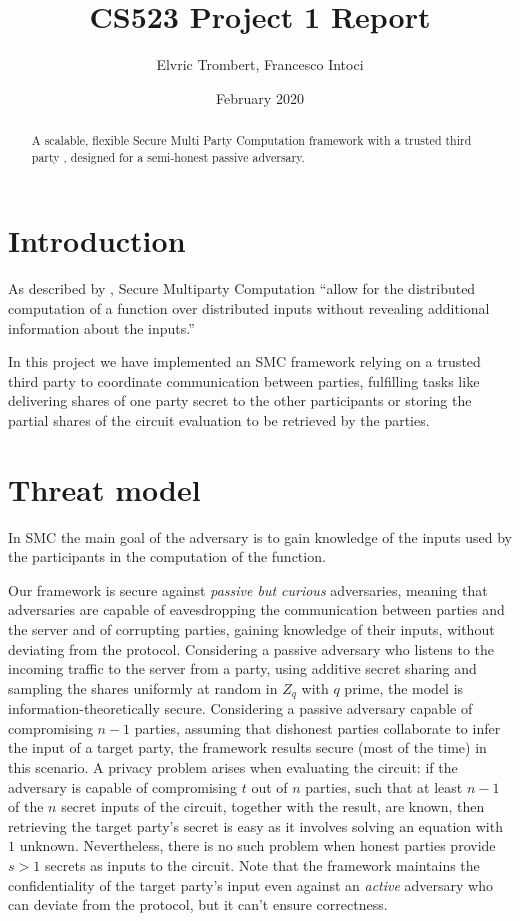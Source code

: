 \documentclass[10pt,conference,compsocconf]{IEEEtran}
\title{CS523 Project 1 Report}
\author{Elvric Trombert, Francesco Intoci}
\date{February 2020}
\begin{document}
\maketitle

\begin{abstract}
    A scalable, flexible Secure Multi Party Computation framework with a trusted third party , designed for a semi-honest passive adversary.
\end{abstract}

\section{Introduction}
As described by \cite[Frikken]{Frikken2011}, Secure Multiparty Computation \enquote{allow for the distributed computation of a
function over distributed inputs without revealing additional information about the inputs.}

In this project we have implemented an SMC framework relying on a trusted third party to coordinate communication between
parties, fulfilling tasks like delivering shares of one party secret to the other participants or storing the partial shares
of the circuit evaluation to be retrieved by the parties.

\section{Threat model}
In SMC the main goal of the adversary is to gain knowledge of the inputs used by the participants in the computation of
the function.

Our framework is secure against \textit{passive but curious} adversaries, meaning that adversaries are capable of eavesdropping
the communication between parties and the server and of corrupting parties, gaining knowledge of their inputs, without deviating from the protocol.
Considering a passive adversary who listens to the incoming traffic to the server from a party, using additive secret
sharing and sampling the shares uniformly at random in $Z_q$ with $q$ prime, the model is information-theoretically secure.
Considering a passive adversary capable of compromising $n-1$ parties, assuming that dishonest parties collaborate to
infer the input of a target party, the framework results secure (most of the time) in this scenario.
A privacy problem arises when evaluating the circuit: if the adversary is capable of compromising $t$ out of $n$ parties,
such that at least $n-1$ of the $n$ secret inputs of the circuit, together with the result, are known, then retrieving the
target party's secret is easy as it involves solving an equation with $1$ unknown.
Nevertheless, there is no such problem when honest parties provide $s > 1$ secrets as inputs to the circuit.
Note that the framework maintains the confidentiality of the target party's input even against an
\textit{active} adversary who can deviate from the protocol, but it can't ensure correctness.
\end{document}
